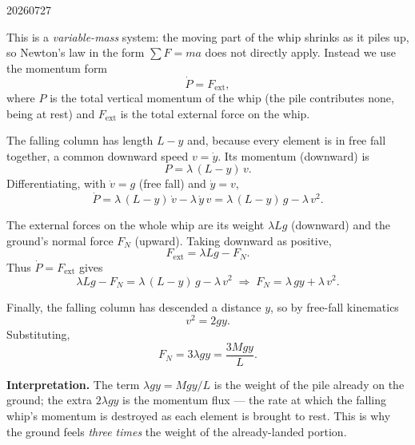 \begin{solution}{20260727}

This is a \emph{variable-mass} system: the moving part of the whip shrinks as it piles up, so Newton's law in the form $\sum F = m a$ does not directly apply.  Instead we use the momentum form
\[
  \dot{P} = F_{\text{ext}},
\]
where $P$ is the total vertical momentum of the whip (the pile contributes none, being at rest) and $F_{\text{ext}}$ is the total external force on the whip.

The falling column has length $L-y$ and, because every element is in free fall together, a common downward speed $v = \dot{y}$.  Its momentum (downward) is
\[
  P = \lambda\,(L-y)\,v .
\]
Differentiating, with $\dot v = g$ (free fall) and $\dot y = v$,
\[
  \dot{P} = \lambda\,(L-y)\,\dot{v} - \lambda\,\dot{y}\,v
          = \lambda\,(L-y)\,g - \lambda\,v^{2}.
\]

The external forces on the whole whip are its weight $\lambda L g$ (downward) and the ground's normal force $F_N$ (upward).  Taking downward as positive,
\[
  F_{\text{ext}} = \lambda L g - F_N .
\]
Thus $\dot P = F_{\text{ext}}$ gives
\[
  \lambda L g - F_N = \lambda\,(L-y)\,g - \lambda\,v^{2}
  \;\Longrightarrow\;
  F_N = \lambda\,g y + \lambda\,v^{2}.
\]

Finally, the falling column has descended a distance $y$, so by free-fall kinematics
\[
  v^{2} = 2gy .
\]
Substituting,
\[
  \boxed{F_N = 3\lambda g y = \frac{3Mgy}{L}} .
\]

\textbf{Interpretation.}  The term $\lambda g y = Mgy/L$ is the weight of the pile already on the ground; the extra $2\lambda g y$ is the momentum flux — the rate at which the falling whip's momentum is destroyed as each element is brought to rest.  This is why the ground feels \emph{three times} the weight of the already-landed portion.

\end{solution}


